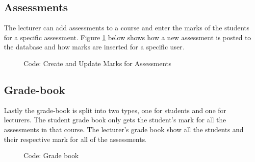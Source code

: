 \documentclass[a4paper,12pt]{article}
\numberwithin{equation}{section} %
\numberwithin{figure}{section}
\begin{document}
\subsection{Assessments}
The lecturer can add assessments to a course and enter the marks of the students for a specific assessment. Figure \ref{cAses} below shows how a new assessment is posted to the database and how marks are inserted for a specific user.

\begin{figure}[H]
\centering
{}
\caption{Code: Create and Update Marks for Assessments}
\label{cAses}
\end{figure}


\subsection{Grade-book}
Lastly the grade-book is split into two types, one for students and one for lecturers. The student grade book only gets the student's mark for all the assessments in that course. The lecturer's grade book show all the students and their respective mark for all of the assessments. 

\begin{figure}[H]
\centering
{}
\caption{Code: Grade book}
\label{cGrade}
\end{figure}
\end{document}
